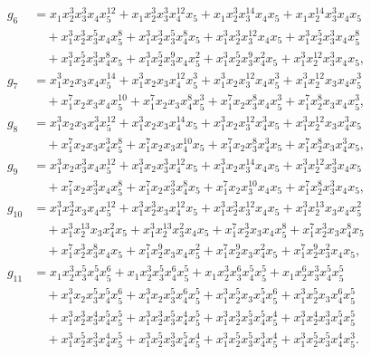 \documentclass[reqno]{amsart}
\theoremstyle{plain}
\theoremstyle{definition}
\theoremstyle{plain}
\theoremstyle{definition}
\numberwithin{equation}{section}
\begin{document}
\begin{align*}
g_6 &= x_1x_2^{3}x_3^{3}x_4x_5^{12} + x_1x_2^{3}x_3^{3}x_4^{12}x_5 + x_1x_2^{3}x_3^{14}x_4x_5 + x_1x_2^{14}x_3^{3}x_4x_5\\ &\quad + x_1^{3}x_2^{3}x_3^{5}x_4x_5^{8} + x_1^{3}x_2^{3}x_3^{5}x_4^{8}x_5 + x_1^{3}x_2^{3}x_3^{12}x_4x_5 + x_1^{3}x_2^{5}x_3^{3}x_4x_5^{8}\\ &\quad + x_1^{3}x_2^{5}x_3^{3}x_4^{8}x_5 + x_1^{3}x_2^{5}x_3^{9}x_4x_5^{2} + x_1^{3}x_2^{5}x_3^{9}x_4^{2}x_5 + x_1^{3}x_2^{12}x_3^{3}x_4x_5,\\
g_7 & = x_1^{3}x_2x_3x_4x_5^{14} + x_1^{3}x_2x_3x_4^{12}x_5^{3} + x_1^{3}x_2x_3^{12}x_4x_5^{3} + x_1^{3}x_2^{12}x_3x_4x_5^{3}\\ &\quad + x_1^{7}x_2x_3x_4x_5^{10} + x_1^{7}x_2x_3x_4^{8}x_5^{3} + x_1^{7}x_2x_3^{8}x_4x_5^{3} + x_1^{7}x_2^{8}x_3x_4x_5^{3},\\
g_8 &= x_1^{3}x_2x_3x_4^{3}x_5^{12} + x_1^{3}x_2x_3x_4^{14}x_5 + x_1^{3}x_2x_3^{12}x_4^{3}x_5 + x_1^{3}x_2^{12}x_3x_4^{3}x_5\\ &\quad + x_1^{7}x_2x_3x_4^{3}x_5^{8} + x_1^{7}x_2x_3x_4^{10}x_5 + x_1^{7}x_2x_3^{8}x_4^{3}x_5 + x_1^{7}x_2^{8}x_3x_4^{3}x_5,\\
g_9 &= x_1^{3}x_2x_3^{3}x_4x_5^{12} + x_1^{3}x_2x_3^{3}x_4^{12}x_5 + x_1^{3}x_2x_3^{14}x_4x_5 + x_1^{3}x_2^{12}x_3^{3}x_4x_5\\ &\quad + x_1^{7}x_2x_3^{3}x_4x_5^{8} + x_1^{7}x_2x_3^{3}x_4^{8}x_5 + x_1^{7}x_2x_3^{10}x_4x_5 + x_1^{7}x_2^{8}x_3^{3}x_4x_5,\\
g_{10} &= x_1^{3}x_2^{3}x_3x_4x_5^{12} + x_1^{3}x_2^{3}x_3x_4^{12}x_5 + x_1^{3}x_2^{3}x_3^{12}x_4x_5 + x_1^{3}x_2^{13}x_3x_4x_5^{2}\\ &\quad + x_1^{3}x_2^{13}x_3x_4^{2}x_5 + x_1^{3}x_2^{13}x_3^{2}x_4x_5 + x_1^{7}x_2^{3}x_3x_4x_5^{8} + x_1^{7}x_2^{3}x_3x_4^{8}x_5\\ &\quad + x_1^{7}x_2^{3}x_3^{8}x_4x_5 + x_1^{7}x_2^{9}x_3x_4x_5^{2} + x_1^{7}x_2^{9}x_3x_4^{2}x_5 + x_1^{7}x_2^{9}x_3^{2}x_4x_5,\\
g_{11} &= x_1x_2^{3}x_3^{5}x_4^{5}x_5^{6} + x_1x_2^{3}x_3^{5}x_4^{6}x_5^{5} + x_1x_2^{3}x_3^{6}x_4^{5}x_5^{5} + x_1x_2^{6}x_3^{3}x_4^{5}x_5^{5}\\ &\quad + x_1^{3}x_2x_3^{5}x_4^{5}x_5^{6} + x_1^{3}x_2x_3^{5}x_4^{6}x_5^{5} + x_1^{3}x_2^{5}x_3x_4^{5}x_5^{6} + x_1^{3}x_2^{5}x_3x_4^{6}x_5^{5}\\ &\quad + x_1^{3}x_2^{3}x_3^{4}x_4^{5}x_5^{5} + x_1^{3}x_2^{3}x_3^{5}x_4^{4}x_5^{5} + x_1^{3}x_2^{3}x_3^{5}x_4^{5}x_5^{4} + x_1^{3}x_2^{4}x_3^{3}x_4^{5}x_5^{5}\\ &\quad + x_1^{3}x_2^{5}x_3^{3}x_4^{4}x_5^{5} + x_1^{3}x_2^{5}x_3^{3}x_4^{5}x_5^{4} + x_1^{3}x_2^{5}x_3^{5}x_4^{3}x_5^{4} + x_1^{3}x_2^{5}x_3^{5}x_4^{4}x_5^{3}.
\end{align*}
\end{document}
